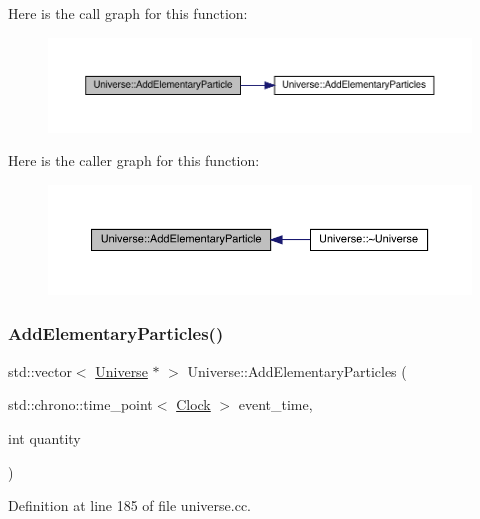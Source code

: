 Here is the call graph for this function\+:
\nopagebreak
\begin{figure}[H]
\begin{center}
\leavevmode
\includegraphics[width=350pt]{class_universe_ab9c84e0576de50aa4fa46655832ce5e4_cgraph}
\end{center}
\end{figure}
Here is the caller graph for this function\+:
\nopagebreak
\begin{figure}[H]
\begin{center}
\leavevmode
\includegraphics[width=350pt]{class_universe_ab9c84e0576de50aa4fa46655832ce5e4_icgraph}
\end{center}
\end{figure}
\mbox{\label{class_universe_a857cf7f208cd11c80736e82fa523feb5}} 
\subsubsection{\texorpdfstring{Add\+Elementary\+Particles()}{AddElementaryParticles()}}
{\footnotesize\ttfamily std\+::vector$<$ \hyperlink{class_universe}{Universe} $\ast$ $>$ Universe\+::\+Add\+Elementary\+Particles (\begin{DoxyParamCaption}\item[{std\+::chrono\+::time\+\_\+point$<$ \hyperlink{universe_8h_a0ef8d951d1ca5ab3cfaf7ab4c7a6fd80}{Clock} $>$}]{event\+\_\+time,  }\item[{int}]{quantity }\end{DoxyParamCaption})}



Definition at line 185 of file universe.\+cc.

